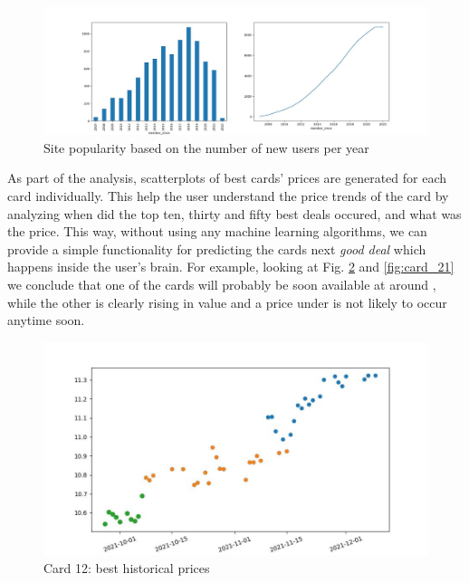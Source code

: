 \begin{figure}
    \centering
    \includegraphics[width=\textwidth]{figures/site_popularity.jpg}
    \caption{Site popularity based on the number of new users per year}
    \label{fig:site_popularity}
\end{figure}

As part of the analysis, scatterplots of best cards' prices are generated for each card individually. This help the user understand the price trends of the card by analyzing when did the top ten, thirty and fifty best deals occured, and what was the price. This way, without using any machine learning algorithms, we can provide a simple functionality for predicting the cards next \textit{good deal} which happens inside the user's brain. For example, looking at Fig. \ref{fig:card_12} and \ref{fig:card_21} we conclude that one of the cards will probably be soon available at around , while the other is clearly rising in value and a price under  is not likely to occur anytime soon.

\begin{figure}
    \centering
    \includegraphics[width=\textwidth]{figures/card_12.jpg}
    \caption{Card 12: best historical prices}
    \label{fig:card_12}
\end{figure}

